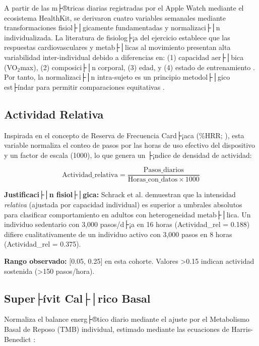 A partir de las m├®tricas diarias registradas por el Apple Watch mediante el ecosistema HealthKit, se derivaron cuatro variables semanales mediante transformaciones fisiol├│gicamente fundamentadas y normalizaci├│n individualizada. La literatura de fisiolog├¡a del ejercicio establece que las respuestas cardiovasculares y metab├│licas al movimiento presentan alta variabilidad inter-individual debido a diferencias en: (1) capacidad aer├│bica (VO$_2$max), (2) composici├│n corporal, (3) edad, y (4) estado de entrenamiento \cite{Riebe2018ACSM}. Por tanto, la normalizaci├│n intra-sujeto es un principio metodol├│gico est├índar para permitir comparaciones equitativas \cite{Schrack2018,Ho2022}.

\subsection{Actividad Relativa}
\label{subsec:actividad_relativa}

Inspirada en el concepto de Reserva de Frecuencia Card├¡aca (\%HRR; \cite{Schrack2018}), esta variable normaliza el conteo de pasos por las horas de uso efectivo del dispositivo y un factor de escala (1000), lo que genera un ├¡ndice de densidad de actividad:

\begin{equation}
\text{Actividad\_relativa} = \frac{\text{Pasos\_diarios}}{\text{Horas\_con\_datos} \times 1000}
\label{eq:actividad_relativa}
\end{equation}

\textbf{Justificaci├│n fisiol├│gica:} Schrack et al. \cite{Schrack2018} demuestran que la intensidad \textit{relativa} (ajustada por capacidad individual) es superior a umbrales absolutos para clasificar comportamiento en adultos con heterogeneidad metab├│lica. Un individuo sedentario con 3,000 pasos/d├¡a en 16 horas (Actividad\_rel = 0.188) difiere cualitativamente de un individuo activo con 3,000 pasos en 8 horas (Actividad\_rel = 0.375).

\textbf{Rango observado:} [0.05, 0.25] en esta cohorte. Valores >0.15 indican actividad sostenida (>150 pasos/hora).

\subsection{Super├ívit Cal├│rico Basal}
\label{subsec:superavit_calorico}

Normaliza el balance energ├®tico diario mediante el ajuste por el Metabolismo Basal de Reposo (TMB) individual, estimado mediante las ecuaciones de Harris-Benedict \cite{Harris1918}:

